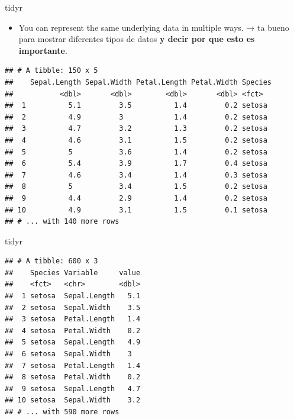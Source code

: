 \documentclass[ignorenonframetext,]{beamer}
\providecommand{\tightlist}{%
  \setlength{\itemsep}{0pt}\setlength{\parskip}{0pt}}
\begin{document}
\begin{frame}[fragile]{tidyr}
\protect\hypertarget{tidyr-1}{}

\begin{itemize}
\tightlist
\item
  You can represent the same underlying data in multiple ways. → ta
  bueno para mostrar diferentes tipos de datos \textbf{y decir por que
  esto es importante}.
\end{itemize}

\begin{verbatim}
## # A tibble: 150 x 5
##    Sepal.Length Sepal.Width Petal.Length Petal.Width Species
##           <dbl>       <dbl>        <dbl>       <dbl> <fct>  
##  1          5.1         3.5          1.4         0.2 setosa 
##  2          4.9         3            1.4         0.2 setosa 
##  3          4.7         3.2          1.3         0.2 setosa 
##  4          4.6         3.1          1.5         0.2 setosa 
##  5          5           3.6          1.4         0.2 setosa 
##  6          5.4         3.9          1.7         0.4 setosa 
##  7          4.6         3.4          1.4         0.3 setosa 
##  8          5           3.4          1.5         0.2 setosa 
##  9          4.4         2.9          1.4         0.2 setosa 
## 10          4.9         3.1          1.5         0.1 setosa 
## # ... with 140 more rows
\end{verbatim}

\end{frame}

\begin{frame}[fragile]{tidyr}
\protect\hypertarget{tidyr-2}{}

\begin{verbatim}
## # A tibble: 600 x 3
##    Species Variable     value
##    <fct>   <chr>        <dbl>
##  1 setosa  Sepal.Length   5.1
##  2 setosa  Sepal.Width    3.5
##  3 setosa  Petal.Length   1.4
##  4 setosa  Petal.Width    0.2
##  5 setosa  Sepal.Length   4.9
##  6 setosa  Sepal.Width    3  
##  7 setosa  Petal.Length   1.4
##  8 setosa  Petal.Width    0.2
##  9 setosa  Sepal.Length   4.7
## 10 setosa  Sepal.Width    3.2
## # ... with 590 more rows
\end{verbatim}

\end{frame}
\end{document}
